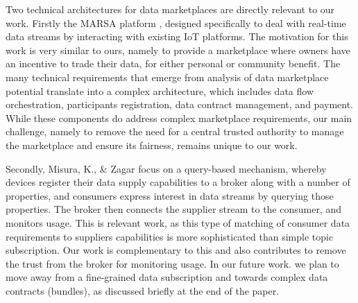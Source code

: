 \documentclass[chi_draft]{sigchi}
\begin{document}
Two technical architectures for data marketplaces are directly relevant to our work.
Firstly the MARSA platform \cite{Cao:2016:MMR:2926746.2883611}, designed specifically to deal with real-time data streams by interacting with existing IoT platforms.
The motivation for this work is very similar to ours, namely to provide a marketplace where owners have an incentive to trade their data, for either personal or community benefit.
The many technical requirements that emerge from analysis of data marketplace potential translate into a complex architecture, which includes data flow orchestration, participants registration, data contract management, and payment.  
While these components do address complex marketplace requirements, our main challenge, namely to remove the need for a central trusted authority to manage the marketplace and ensure its fairness, remains unique to our work.

Secondly, Misura, K., \& Zagar \cite{7765669} focus on a query-based mechanism, whereby devices register their data supply capabilities to a broker along with a number of properties, and consumers express interest in data streams by querying those properties. The broker then connects the supplier stream to the consumer, and monitors usage. 
This is relevant work, as this type of matching of consumer data requirements to suppliers capabilities is more sophisticated than simple topic subscription. Our work is complementary to this  and also contributes to remove the trust from the broker for monitoring usage.
In our future work. we plan to move away from a fine-grained data subscription and towards complex data contracts (bundles), as discussed briefly at the end of the paper.
\end{document}

